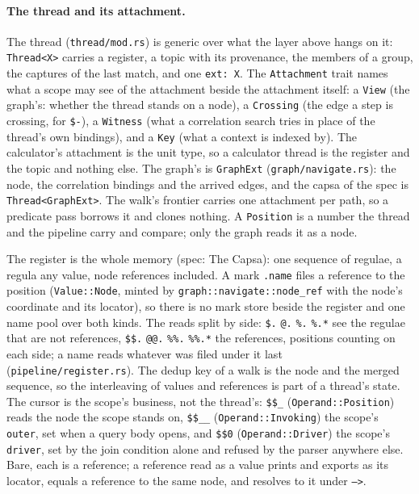 \documentclass{report}
\begin{document}
\paragraph{The thread and its attachment.} The thread
(\texttt{thread/mod.rs}) is generic over what the layer above hangs
on it: \texttt{Thread<X>} carries a register, a topic with its
provenance, the members of a group, the captures of the last match,
and one \texttt{ext: X}. The \texttt{Attachment} trait names what a
scope may see of the attachment beside the attachment itself: a
\texttt{View} (the graph's: whether the thread stands on a node), a
\texttt{Crossing} (the edge a step is crossing, for \texttt{\$-}), a
\texttt{Witness} (what a correlation search tries in place of the
thread's own bindings), and a \texttt{Key} (what a context is indexed
by). The calculator's attachment is the unit type, so a calculator
thread is the register and the topic and nothing else. The graph's
is \texttt{GraphExt} (\texttt{graph/navigate.rs}): the node, the
correlation bindings and the arrived edges, and the capsa of the
spec is \texttt{Thread<GraphExt>}. The walk's frontier carries one
attachment per path, so a predicate pass borrows it and clones
nothing. A \texttt{Position} is a number the thread and the pipeline
carry and compare; only the graph reads it as a node.

The register is the whole memory (spec: The Capsa): one sequence of
regulae, a regula any value, node references included. A mark
\texttt{.name} files a reference to the position
(\texttt{Value::Node}, minted by \texttt{graph::navigate::node\_ref}
with the node's coordinate and its locator), so there is no mark
store beside the register and one name pool over both kinds. The
reads split by side: \texttt{\$.} \texttt{@.} \texttt{\%.}
\texttt{\%.*} see the regulae that are not references, \texttt{\$\$.}
\texttt{@@.} \texttt{\%\%.} \texttt{\%\%.*} the references, positions
counting on each side; a name reads whatever was filed under it last
(\texttt{pipeline/register.rs}). The dedup key of a walk is the node
and the merged sequence, so the interleaving of values and
references is part of a thread's state. The cursor is the scope's
business, not the thread's: \texttt{\$\$\_} (\texttt{Operand::Position})
reads the node the scope stands on, \texttt{\$\$\_\_}
(\texttt{Operand::Invoking}) the scope's \texttt{outer}, set when a
query body opens, and \texttt{\$\$0} (\texttt{Operand::Driver}) the
scope's \texttt{driver}, set by the join condition alone and refused
by the parser anywhere else. Bare, each is a reference; a reference
read as a value prints and exports as its locator, equals a
reference to the same node, and resolves to it under \texttt{-->}.
\end{document}
